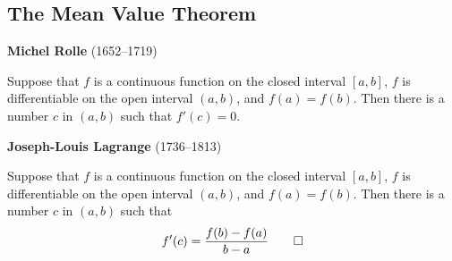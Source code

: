 \subsection{The Mean Value Theorem}
\textbf{Michel Rolle} (1652--1719)
\begin{theorem}
    Suppose that \(f\) is a continuous function on the closed interval \([a,b]\),
    \(f\) is differentiable on the open interval \((a,b)\), and \(f(a)=f(b)\).
    Then there is a number \(c\) in \((a,b)\) such that \(f'(c)=0\).
\end{theorem}
\textbf{Joseph-Louis Lagrange} (1736--1813)
\begin{theorem}
    Suppose that \(f\) is a continuous function on the closed interval \([a,b]\),
    \(f\) is differentiable on the open interval \((a,b)\), and \(f(a)=f(b)\).
    Then there is a number \(c\) in \((a,b)\) such that
    \[f'(c)=\frac{f(b)-f(a)}{b-a}\qedhere\]
\end{theorem}